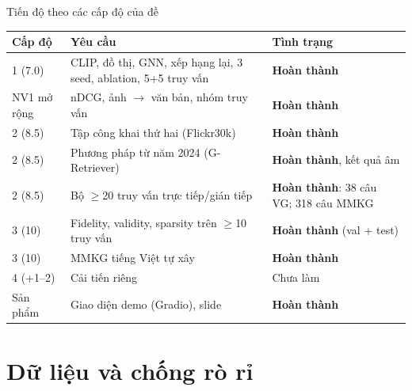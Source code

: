 \documentclass[10pt, aspectratio=169]{beamer}
\begin{document}
\begin{frame}{Tiến độ theo các cấp độ của đề}
  \centering\small
  \begin{tabular}{l p{6.0cm} l}
    \toprule
    \textbf{Cấp độ} & \textbf{Yêu cầu} & \textbf{Tình trạng} \\
    \midrule
    1 (7.0) & CLIP, đồ thị, GNN, xếp hạng lại, 3 seed, ablation, 5+5 truy vấn & \textcolor{xanh}{\textbf{Hoàn thành}} \\
    NV1 mở rộng & nDCG, ảnh $\to$ văn bản, nhóm truy vấn & \textcolor{xanh}{\textbf{Hoàn thành}} \\
    2 (8.5) & Tập công khai thứ hai (Flickr30k) & \textcolor{xanh}{\textbf{Hoàn thành}} \\
    2 (8.5) & Phương pháp từ năm 2024 (G-Retriever) & \textcolor{xanh}{\textbf{Hoàn thành}}, kết quả âm \\
    2 (8.5) & Bộ $\ge$20 truy vấn trực tiếp/gián tiếp & \textcolor{xanh}{\textbf{Hoàn thành}}: 38 câu VG; 318 câu MMKG \\
    3 (10) & Fidelity, validity, sparsity trên $\ge$10 truy vấn & \textcolor{xanh}{\textbf{Hoàn thành}} (val + test) \\
    3 (10) & MMKG tiếng Việt tự xây & \textcolor{xanh}{\textbf{Hoàn thành}} \\
    4 (+1--2) & Cải tiến riêng & \textcolor{do}{Chưa làm} \\
    Sản phẩm & Giao diện demo (Gradio), slide & \textcolor{xanh}{\textbf{Hoàn thành}} \\
    \bottomrule
  \end{tabular}
\end{frame}

\section{Dữ liệu và chống rò rỉ}
\end{document}

